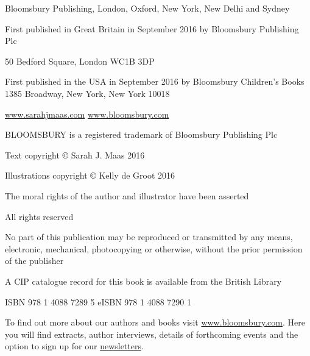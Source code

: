 
\newpage 
Bloomsbury Publishing, London, Oxford, New York, New Delhi and Sydney

First published in Great Britain in September 2016 by Bloomsbury Publishing Plc

50 Bedford Square, London WC1B 3DP

First published in the USA in September 2016 by Bloomsbury Children's Books 1385 Broadway, New York, New York 10018

\href{http://www.sarahjmaas.com/}{www.sarahjmaas.com}
\href{http://www.bloomsbury.com/}{www.bloomsbury.com}

BLOOMSBURY is a registered trademark of Bloomsbury Publishing Plc

Text copyright © Sarah J. Maas 2016

Illustrations copyright © Kelly de Groot 2016

The moral rights of the author and illustrator have been asserted

All rights reserved

No part of this publication may be reproduced or transmitted by any means, electronic, mechanical, photocopying or otherwise, without the prior permission of the publisher

A CIP catalogue record for this book is available from the British Library

ISBN 978 1 4088 7289 5 eISBN 978 1 4088 7290 1

To find out more about our authors and books visit
\href{http://www.bloomsbury.com/}{www.bloomsbury.com}. Here you will find extracts, author interviews, details of forthcoming events and the option to sign up for our \href{http://www.bloomsbury.com/uk/newsletter/NewsletterApi}{newsletters}.
